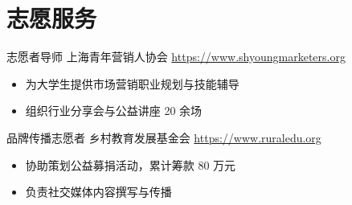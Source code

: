 \documentclass[a4paper, serif, 10pt]{moderncv}
\begin{document}
\section{志愿服务}

        {志愿者导师}
        {上海青年营销人协会}
        {\url{https://www.shyoungmarketers.org}}
        {}
        {\begin{itemize}
\item 为大学生提供市场营销职业规划与技能辅导
\item 组织行业分享会与公益讲座 20 余场
\end{itemize}}
    

        {品牌传播志愿者}
        {乡村教育发展基金会}
        {\url{https://www.ruraledu.org}}
        {}
        {\begin{itemize}
\item 协助策划公益募捐活动，累计筹款 80 万元
\item 负责社交媒体内容撰写与传播
\end{itemize}}
    
\end{document}
